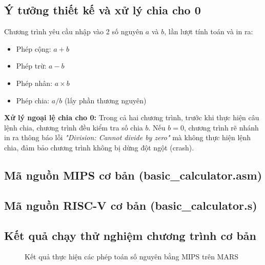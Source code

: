 \documentclass[12pt,a4paper]{article}
\newcommand{\MipsPath}{mips/}%
\newcommand{\RiscvPath}{riscv/}%
\newcommand{\MipsPath}{../mips/}%
\newcommand{\RiscvPath}{../riscv/}%
\begin{document}
\subsection{Ý tưởng thiết kế và xử lý chia cho 0}
Chương trình yêu cầu nhập vào 2 số nguyên $a$ và $b$, lần lượt tính toán và in ra:
\begin{itemize}
    \item Phép cộng: $a + b$
    \item Phép trừ: $a - b$
    \item Phép nhân: $a \times b$
    \item Phép chia: $a / b$ (lấy phần thương nguyên)
\end{itemize}
\textbf{Xử lý ngoại lệ chia cho 0:} Trong cả hai chương trình, trước khi thực hiện câu lệnh chia, chương trình đều kiểm tra số chia $b$. Nếu $b = 0$, chương trình rẽ nhánh in ra thông báo lỗi \textit{"Division: Cannot divide by zero"} mà không thực hiện lệnh chia, đảm bảo chương trình không bị dừng đột ngột (crash).

\subsection{Mã nguồn MIPS cơ bản (basic\_calculator.asm)}


\subsection{Mã nguồn RISC-V cơ bản (basic\_calculator.s)}


\subsection{Kết quả chạy thử nghiệm chương trình cơ bản}

\begin{figure}[H]
    \centering
    \caption{Kết quả thực hiện các phép toán số nguyên bằng MIPS trên MARS}
    \label{fig:mips-basic-run}
\end{figure}
\end{document}
